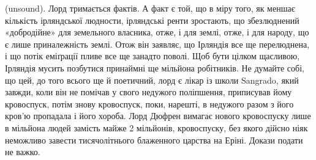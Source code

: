 \parcont{}  %
(unsound). Лорд тримається фактів. А факт є той, що в міру того,
як меншає кількість ірляндської людности, ірляндські ренти
зростають, що збезлюднений «добродійне» для земельного власника,
отже, і для землі, отже, і для народу, що є лише приналежність
землі. Отож він заявляє, що Ірляндія все ще перелюднена,
і що потік еміґрації пливе все ще занадто поволі. Щоб бути цілком
щасливою, Ірляндія мусить позбутися принаймні ще  мільйона
робітників. Не думайте собі, що цей, до того всього ще й
поетичний, лорд є лікар із школи Sangrado, який завжди, коли
він не помічав у свого недужого поліпшення, приписував йому
кровоспуск, потім знову кровоспуск, поки, нарешті, в недужого
разом з його кров’ю пропадала і його хороба. Лорд Дюфрен
вимагає нового кровоспуску лише в  мільйона людей
замість майже 2 мільйонів, кровоспуску, без якого дійсно ніяк
неможливо завести тисячолітнього блаженного царства на Еріні.
Докази подати не важко.
\setlength{\tabcolsep}{5pt}
